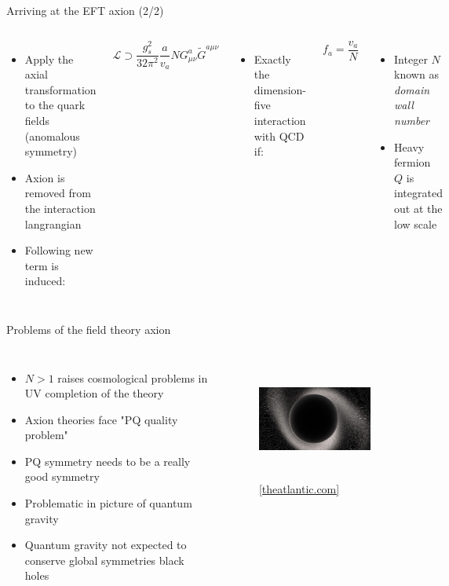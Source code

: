 \documentclass[aspectratio=1610, 9pt]{beamer}
\begin{document}
\begin{frame}{Arriving at the EFT axion (2/2)}
  \begin{columns}
    \column{\textwidth}
    \begin{itemize}
      \item Apply the axial transformation to the quark fields (anomalous symmetry)
      \item Axion is removed from the interaction langrangian
      \item Following new term is induced:
    \end{itemize}
    \begin{equation*}
      \mathcal{L} \supset \frac{g_s^2}{32\pi^2} \frac{a}{v_a} N G^a_{\mu\nu} \tilde{G}^{a\mu\nu}
    \end{equation*}
    \begin{itemize}
      \item Exactly the dimension-five interaction with QCD if:
    \end{itemize}
    \begin{equation*}
      f_a = \frac{v_a}{N}
    \end{equation*}
    \begin{itemize}
      \item Integer $N$ known as \textit{domain wall number}
      \item Heavy fermion $Q$ is integrated out at the low scale
    \end{itemize}
  \end{columns} 
\end{frame}

\begin{frame}{Problems of the field theory axion}
  \begin{columns}
    \begin{itemize}
      \item $N>1$ raises cosmological problems in UV completion of the theory
      \item Axion theories face "PQ quality problem"
      \item PQ symmetry needs to be a really good symmetry
      \item Problematic in picture of quantum gravity
      \item Quantum gravity not expected to conserve global symmetries \rightarrow black holes
    \end{itemize}
    \begin{figure}
    \includegraphics[height=4cm]{images/hole.png}
    \caption{\footnotesize \href{https://www.theatlantic.com/science/archive/2021/03/black-hole-cygnus-suprise/618049/}{{[theatlantic.com]}}}
    \end{figure}
  \end{columns}
\end{frame}
\end{document}
